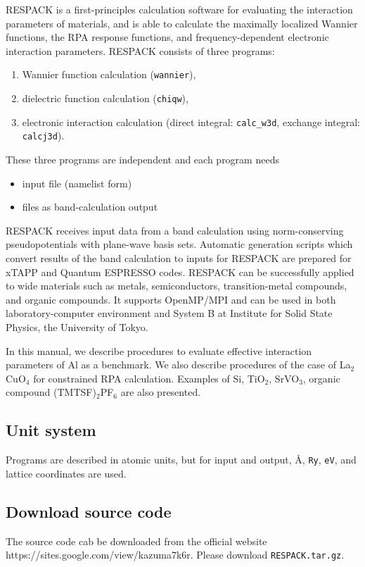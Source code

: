 \documentclass{article}
\begin{document}
{\sc RESPACK} is a first-principles calculation software for evaluating the interaction parameters of materials, and is able to calculate the maximally localized Wannier functions, the RPA response functions, and frequency-dependent electronic interaction parameters. {\sc RESPACK} consists of three programs:
\begin{enumerate}
\item Wannier function calculation (\verb+wannier+),
\item dielectric function calculation (\verb+chiqw+),
\item electronic interaction calculation (direct integral: \verb+calc_w3d+, exchange integral: \verb+calcj3d+).
\end{enumerate}
These three programs are independent and each program needs
\begin{itemize}
\item input file (namelist form)
\item files as band-calculation output
\end{itemize}
{\sc RESPACK} receives input data from a band calculation using norm-conserving pseudopotentials with plane-wave basis sets. Automatic generation scripts which convert results of the band calculation to inputs for RESPACK are prepared for {\sc xTAPP} and {\sc Quantum ESPRESSO} codes. RESPACK can be successfully applied to wide materials such as metals, semiconductors, transition-metal compounds, and organic compounds. It supports {\sc OpenMP/MPI} and can be used in both laboratory-computer environment and System B at Institute for Solid State Physics, the University of Tokyo.

In this manual, we describe procedures to evaluate effective interaction parameters of Al as a benchmark. We also describe procedures of the case of La$_2$CuO$_4$ for constrained RPA calculation. Examples of Si, TiO$_2$, SrVO$_3$, organic compound (TMTSF)$_2$PF$_6$ are also presented.

\subsection{Unit system}

Programs are described in atomic units, but for input and output, \AA, \verb+Ry+, \verb+eV+, and lattice coordinates are used.

\subsection{Download source code}
The source code cab be downloaded from the official website https://sites.google.com/view/kazuma7k6r. Please download \verb+RESPACK.tar.gz+.
\end{document}
